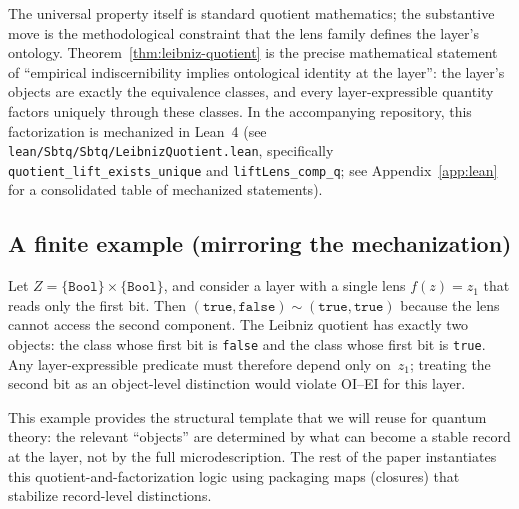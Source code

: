The universal property itself is standard quotient mathematics; the substantive move is the methodological constraint that the lens family defines the layer's ontology. Theorem~\ref{thm:leibniz-quotient} is the precise mathematical statement of ``empirical indiscernibility implies ontological identity at the layer'': the layer's objects are exactly the equivalence classes, and every layer-expressible quantity factors uniquely through these classes. In the accompanying repository, this factorization is mechanized in Lean~4 (see \texttt{lean/Sbtq/Sbtq/LeibnizQuotient.lean}, specifically \texttt{quotient\_lift\_exists\_unique} and \texttt{liftLens\_comp\_q}; see Appendix~\ref{app:lean} for a consolidated table of mechanized statements).

\subsection{A finite example (mirroring the mechanization)}

Let $Z=\{\texttt{Bool}\}\times\{\texttt{Bool}\}$, and consider a layer with a single lens $f(z)=z_1$ that reads only the first bit. Then $(\texttt{true},\texttt{false})\sim(\texttt{true},\texttt{true})$ because the lens cannot access the second component. The Leibniz quotient has exactly two objects: the class whose first bit is \texttt{false} and the class whose first bit is \texttt{true}. Any layer-expressible predicate must therefore depend only on~$z_1$; treating the second bit as an object-level distinction would violate OI--EI for this layer.

This example provides the structural template that we will reuse for quantum theory: the relevant ``objects'' are determined by what can become a stable record at the layer, not by the full microdescription. The rest of the paper instantiates this quotient-and-factorization logic using packaging maps (closures) that stabilize record-level distinctions.
